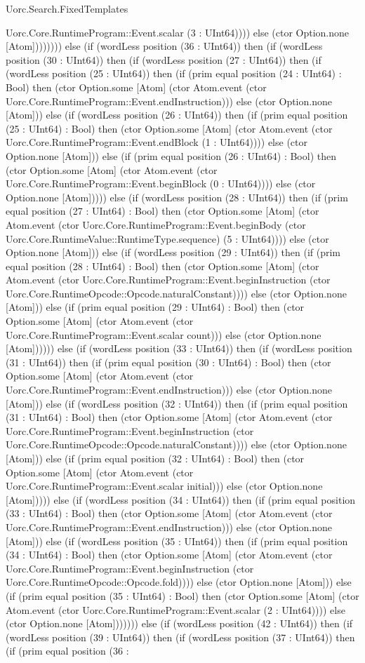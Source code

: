 \begin{lexlean}{Uorc.Search.FixedTemplates}
\begin{semanticmodule}
{Uorc.Core.RuntimeProgram::Event.scalar (3 : UInt64)))) else (ctor Option.none [Atom]))))))) else (if (wordLess position (36 : UInt64)) then (if (wordLess position (30 : UInt64)) then (if (wordLess position (27 : UInt64)) then (if (wordLess position (25 : UInt64)) then (if (prim equal position (24 : UInt64) : Bool) then (ctor Option.some [Atom] (ctor Atom.event (ctor Uorc.Core.RuntimeProgram::Event.endInstruction))) else (ctor Option.none [Atom])) else (if (wordLess position (26 : UInt64)) then (if (prim equal position (25 : UInt64) : Bool) then (ctor Option.some [Atom] (ctor Atom.event (ctor Uorc.Core.RuntimeProgram::Event.endBlock (1 : UInt64)))) else (ctor Option.none [Atom])) else (if (prim equal position (26 : UInt64) : Bool) then (ctor Option.some [Atom] (ctor Atom.event (ctor Uorc.Core.RuntimeProgram::Event.beginBlock (0 : UInt64)))) else (ctor Option.none [Atom])))) else (if (wordLess position (28 : UInt64)) then (if (prim equal position (27 : UInt64) : Bool) then (ctor Option.some [Atom] (ctor Atom.event (ctor Uorc.Core.RuntimeProgram::Event.beginBody (ctor Uorc.Core.RuntimeValue::RuntimeType.sequence) (5 : UInt64)))) else (ctor Option.none [Atom])) else (if (wordLess position (29 : UInt64)) then (if (prim equal position (28 : UInt64) : Bool) then (ctor Option.some [Atom] (ctor Atom.event (ctor Uorc.Core.RuntimeProgram::Event.beginInstruction (ctor Uorc.Core.RuntimeOpcode::Opcode.naturalConstant)))) else (ctor Option.none [Atom])) else (if (prim equal position (29 : UInt64) : Bool) then (ctor Option.some [Atom] (ctor Atom.event (ctor Uorc.Core.RuntimeProgram::Event.scalar count))) else (ctor Option.none [Atom]))))) else (if (wordLess position (33 : UInt64)) then (if (wordLess position (31 : UInt64)) then (if (prim equal position (30 : UInt64) : Bool) then (ctor Option.some [Atom] (ctor Atom.event (ctor Uorc.Core.RuntimeProgram::Event.endInstruction))) else (ctor Option.none [Atom])) else (if (wordLess position (32 : UInt64)) then (if (prim equal position (31 : UInt64) : Bool) then (ctor Option.some [Atom] (ctor Atom.event (ctor Uorc.Core.RuntimeProgram::Event.beginInstruction (ctor Uorc.Core.RuntimeOpcode::Opcode.naturalConstant)))) else (ctor Option.none [Atom])) else (if (prim equal position (32 : UInt64) : Bool) then (ctor Option.some [Atom] (ctor Atom.event (ctor Uorc.Core.RuntimeProgram::Event.scalar initial))) else (ctor Option.none [Atom])))) else (if (wordLess position (34 : UInt64)) then (if (prim equal position (33 : UInt64) : Bool) then (ctor Option.some [Atom] (ctor Atom.event (ctor Uorc.Core.RuntimeProgram::Event.endInstruction))) else (ctor Option.none [Atom])) else (if (wordLess position (35 : UInt64)) then (if (prim equal position (34 : UInt64) : Bool) then (ctor Option.some [Atom] (ctor Atom.event (ctor Uorc.Core.RuntimeProgram::Event.beginInstruction (ctor Uorc.Core.RuntimeOpcode::Opcode.fold)))) else (ctor Option.none [Atom])) else (if (prim equal position (35 : UInt64) : Bool) then (ctor Option.some [Atom] (ctor Atom.event (ctor Uorc.Core.RuntimeProgram::Event.scalar (2 : UInt64)))) else (ctor Option.none [Atom])))))) else (if (wordLess position (42 : UInt64)) then (if (wordLess position (39 : UInt64)) then (if (wordLess position (37 : UInt64)) then (if (prim equal position (36 : }
\end{semanticmodule}
\end{lexlean}
